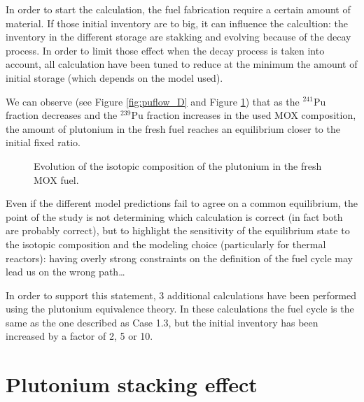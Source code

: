 \documentclass[12pt]{article}
\begin{document}
In order to start the calculation, the fuel fabrication require a certain amount
of material. If those initial inventory are to big, it can influence the
calcultion: the inventory in the different storage are stakking and evolving
because of the decay process. In order to limit those effect when the decay
process is taken into account, all calculation have been tuned to reduce at the
minimum the amount of initial storage (which depends on the model used).

We can observe (see Figure \ref{fig:puflow_D} and Figure \ref{fig:pu_compo})
that as the $^{241}$Pu fraction decreases and the $^{239}$Pu fraction increases in
the used MOX composition, the amount of plutonium in the fresh fuel reaches an
equilibrium closer to the initial fixed ratio.

\begin{figure}[h!]
  \centering
  

  \caption{ Evolution of the isotopic composition of the plutonium in the fresh MOX fuel.
    \label{fig:pu_compo} } 
  \end{figure}

Even if the different model predictions fail to agree on a common equilibrium,
the point of the study is not determining which calculation is correct (in fact
both are probably correct), but to highlight the sensitivity of the equilibrium
state to the isotopic composition and the modeling choice (particularly for
thermal reactors): having overly strong constraints on the definition of the
fuel cycle may lead us on the wrong path\dots


In order to support this statement, 3 additional calculations have been performed
using the plutonium equivalence theory. In these calculations the fuel cycle is
the same as the one described as Case 1.3, but the initial inventory has been
increased by a factor of 2, 5 or 10.


\section{Plutonium stacking effect}
\end{document}
